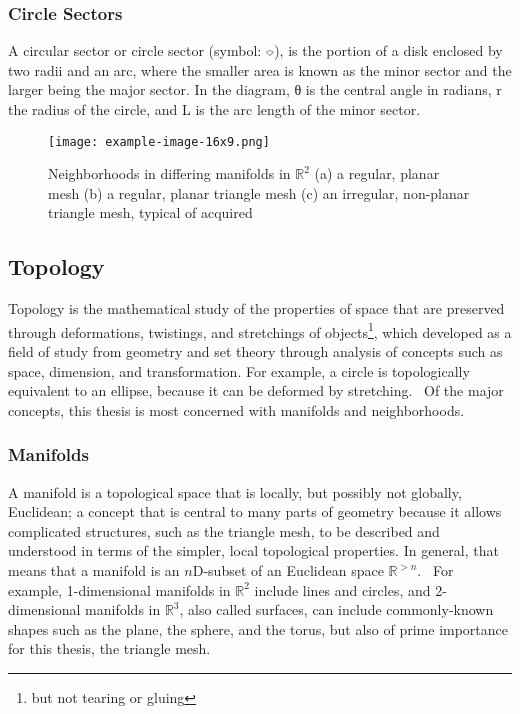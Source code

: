 \subsubsection{Circle Sectors}
A circular sector or circle sector (symbol: ⌔), is the portion of a disk enclosed by two radii and an arc, where the smaller area is known as the minor sector and the larger being the major sector. In the diagram, θ is the central angle in radians,  r the radius of the circle, and L is the arc length of the minor sector.
\begin{figure}
\ffigbox
	{\texttt{[image: example-image-16x9.png]}}
	{\caption[Regular Planar and Irregular Non-planar Neighborhoods in $\mathbb{R}^2$]{Neighborhoods in differing manifolds in $\mathbb{R}^2$ (a) a regular, planar mesh (b) a regular, planar triangle mesh (c) an irregular, non-planar triangle mesh, typical of acquired \tdd{}}\label{fig:neighborhoods}}
\end{figure}
%
%
%
\subsection{Topology}
Topology is the mathematical study of the properties of space that are preserved through deformations, twistings, and stretchings of objects\footnote{but not tearing or gluing}, which developed as a field of study from geometry and set theory through analysis of concepts such as space, dimension, and transformation. For example, a circle is topologically equivalent to an ellipse, because it can be deformed by stretching.~\cite{Weisstein19c} Of the major concepts, this thesis is most concerned with manifolds and neighborhoods.
%
\subsubsection{Manifolds}
A manifold is a topological space that is locally, but possibly not globally, Euclidean; a concept that is central to many parts of geometry because it allows complicated structures, such as the triangle mesh, to be described and understood in terms of the simpler, local topological properties. In general, that means that a manifold is an $n$D-subset of an Euclidean space $\mathbb{R}^{>n}$.~\cite[p.~199]{Mara12} For example, 1-dimensional manifolds in $\mathbb{R}^{2}$ include lines and circles, and 2-dimensional manifolds in $\mathbb{R}^{3}$, also called surfaces, can include commonly-known shapes such as the plane, the sphere, and the torus, but also of prime importance for this thesis, the triangle mesh.
%
